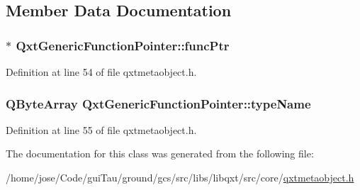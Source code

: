 \subsection{Member Data Documentation}
\hypertarget{class_qxt_generic_function_pointer_abe4abbb31df76fe0b28047461216dca8}{
\subsubsection[{func\-Ptr}]{$\ast$ Qxt\-Generic\-Function\-Pointer\-::func\-Ptr}}\label{class_qxt_generic_function_pointer_abe4abbb31df76fe0b28047461216dca8}


Definition at line 54 of file qxtmetaobject.\-h.

\hypertarget{class_qxt_generic_function_pointer_a0ec2f6f26bec4a9ccfac2b34ff750b0a}{
\subsubsection[{type\-Name}]{\setlength{\rightskip}{0pt plus 5cm}Q\-Byte\-Array Qxt\-Generic\-Function\-Pointer\-::type\-Name}}\label{class_qxt_generic_function_pointer_a0ec2f6f26bec4a9ccfac2b34ff750b0a}


Definition at line 55 of file qxtmetaobject.\-h.



The documentation for this class was generated from the following file\-:\begin{DoxyCompactItemize}
\item 
/home/jose/\-Code/gui\-Tau/ground/gcs/src/libs/libqxt/src/core/\hyperlink{qxtmetaobject_8h}{qxtmetaobject.\-h}\end{DoxyCompactItemize}
